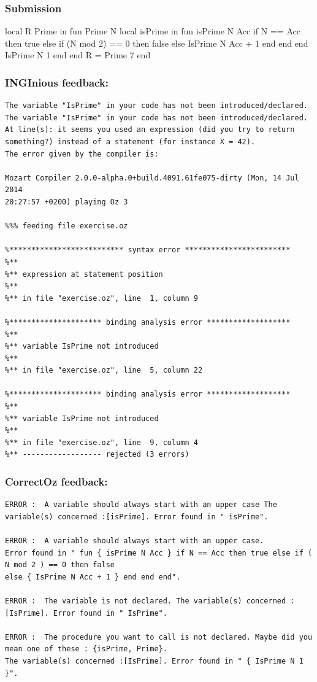 \documentclass[11pt,a4paper,twoside,openright]{report}
\begin{document}
\subsubsection*{Submission}
\begin{OZ}
    local R Prime in
      fun {Prime N}
        local isPrime in
          fun {isPrime N Acc}
            if N == Acc then true
            else 
              if (N mod 2) == 0 then false
              else {IsPrime N Acc + 1}
              end
            end
          end    
          {IsPrime N 1}
        end
      end
      R = {Prime 7}
    end
\end{OZ}
\newpage
\subsubsection*{INGInious feedback:}
\begin{lstlisting}
The variable "IsPrime" in your code has not been introduced/declared.
The variable "IsPrime" in your code has not been introduced/declared.
At line(s): it seems you used an expression (did you try to return something?) instead of a statement (for instance X = 42).
The error given by the compiler is:

Mozart Compiler 2.0.0-alpha.0+build.4091.61fe075-dirty (Mon, 14 Jul 2014 
20:27:57 +0200) playing Oz 3

%%% feeding file exercise.oz

%************************** syntax error ************************
%**
%** expression at statement position
%**
%** in file "exercise.oz", line  1, column 9

%********************* binding analysis error *******************
%**
%** variable IsPrime not introduced
%**
%** in file "exercise.oz", line  5, column 22

%********************* binding analysis error *******************
%**
%** variable IsPrime not introduced
%**
%** in file "exercise.oz", line  9, column 4
%** ------------------ rejected (3 errors)

\end{lstlisting}

\subsubsection*{CorrectOz feedback:}
\begin{lstlisting}
ERROR :  A variable should always start with an upper case The variable(s) concerned :[isPrime]. Error found in " isPrime".

ERROR :  A variable should always start with an upper case. 
Error found in " fun { isPrime N Acc } if N == Acc then true else if ( N mod 2 ) == 0 then false 
else { IsPrime N Acc + 1 } end end end".

ERROR :  The variable is not declared. The variable(s) concerned :[IsPrime]. Error found in " IsPrime".

ERROR :  The procedure you want to call is not declared. Maybe did you mean one of these : {isPrime, Prime}. 
The variable(s) concerned :[IsPrime]. Error found in " { IsPrime N 1 }".
\end{lstlisting}
\end{document}
